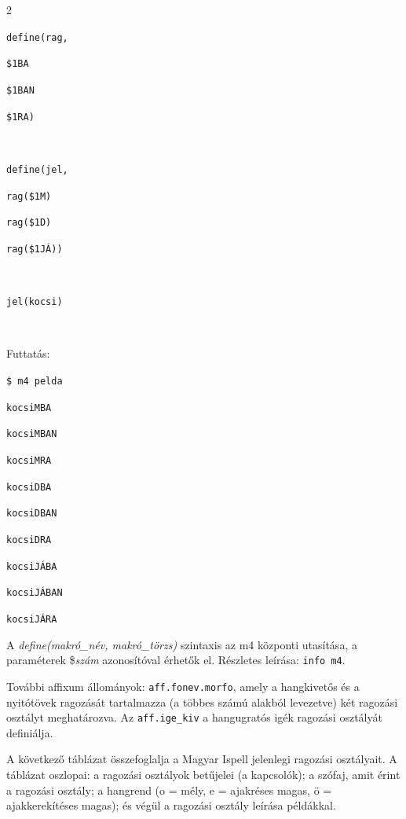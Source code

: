 \begin{multicols}{2}

\texttt{define(rag,}

\texttt{\$1BA}

\texttt{\$1BAN}

\texttt{\$1RA)}

\texttt{~}

\texttt{define(jel,}

\texttt{rag(\$1M)}

\texttt{rag(\$1D)}

\texttt{rag(\$1JÁ))}

\texttt{~}

\texttt{jel(kocsi)}

\texttt{~}

Futtatás:

\texttt{\$~m4~pelda}

\texttt{kocsiMBA}

\texttt{kocsiMBAN}

\texttt{kocsiMRA}

\texttt{kocsiDBA}

\texttt{kocsiDBAN}

\texttt{kocsiDRA}

\texttt{kocsiJÁBA}

\texttt{kocsiJÁBAN}

\texttt{kocsiJÁRA}

\end{multicols}

A \emph{define(makró\_név, makró\_törzs)} szintaxis az m4 központi
utasítása, a paraméterek \$\emph{szám} azonosítóval érhetők
el. Részletes leírása: \texttt{info m4}.

További affixum állományok: \texttt{aff.fonev.morfo}, amely a hangkivetős
és a nyitótövek ragozását tartalmazza (a többes számú alakból
levezetve) két ragozási osztályt meghatározva.
Az \texttt{aff.ige\_kiv} a hangugratós igék ragozási osztályát
definiálja.

A következő táblázat összefoglalja a Magyar Ispell
jelenlegi ragozási osztályait. A táblázat oszlopai:
a ragozási osztályok betűjelei (a kapcsolók);
a szófaj, amit érint a ragozási osztály; a hangrend
(o = mély, e = ajakréses magas, ö = ajakkerekítéses
magas); és végül a ragozási osztály leírása példákkal.


